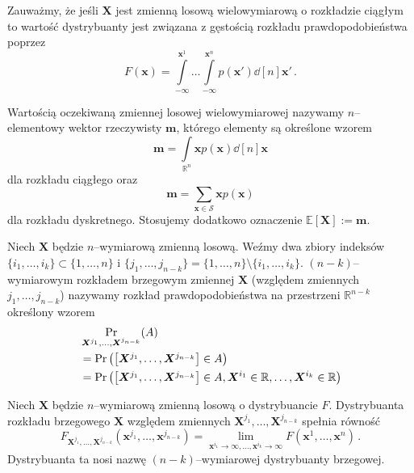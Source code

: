 \documentclass{myclass}
\numberwithin{equation}{subsection}
\begin{document}
Zauważmy, że jeśli \(\bm{X}\) jest zmienną losową wielowymiarową o rozkładzie ciągłym to wartość
dystrybuanty jest związana z gęstością rozkładu prawdopodobieństwa poprzez
\begin{equation}
    F(\bm{x}) = \int\limits_{-\infty}^{\bm{x}^1}\ldots\int\limits_{-\infty}^{\bm{x}^n} p(\bm{x}') \dd[n]{\bm{x}'}\,.
\end{equation}

\begin{definition}
Wartością oczekiwaną zmiennej losowej wielowymiarowej nazywamy \(n\)--elementowy wektor rzeczywisty
\(\bm{m}\), którego elementy są określone wzorem
\begin{equation*}
    \bm{m} = \int\limits_{\mathbb{R}^n} \bm{x} p(\bm{x}) \dd[n]{\bm{x}}
\end{equation*}
dla rozkładu ciągłego oraz
\begin{equation*}
    \bm{m} = \sum_{\bm{x} \in \mathcal{S}} \bm{x} p(\bm{x})
\end{equation*}
dla rozkładu dyskretnego. Stosujemy dodatkowo oznaczenie \(\mathbb{E}[\bm{X}] := \bm{m}\).
\end{definition}

\begin{definition}
Niech \(\bm{X}\) będzie \(n\)--wymiarową zmienną losową. Weźmy dwa zbiory indeksów
\(\{i_1,\ldots,i_k\} \subset \{1,\ldots,n\}\) i \(\{j_1,\ldots,j_{n-k}\} = \{1,\ldots,n\} \setminus
\{i_1,\ldots,i_k\}\). \((n-k)\)--wymiarowym rozkładem brzegowym zmiennej \(\bm{X}\) (względem
zmiennych \(j_1,\ldots,j_{n-k}\)) nazywamy rozkład prawdopodobieństwa na przestrzeni
\(\mathbb{R}^{n-k}\) określony wzorem
\begin{equation*}
    \begin{split}
        &\Pr_{\bm{X}^{j_1},\ldots,\bm{X}^{j_{n-k}}}(A) \\
        &= \Pr\left(\mqty[\bm{X}^{j_1},\ldots,\bm{X}^{j_{n-k}}] \in A\right)\\
        &= \Pr\left(\mqty[\bm{X}^{j_1},\ldots,\bm{X}^{j_{n-k}}] \in A, \bm{X}^{i_1} \in \mathbb{R}, \ldots, \bm{X}^{i_k} \in \mathbb{R}\right)
    \end{split}
\end{equation*}    
\end{definition}

Niech \(\bm{X}\) będzie \(n\)--wymiarową zmienną losową o dystrybuancie \(F\). Dystrybuanta rozkładu
brzegowego \(\bm{X}\) względem zmiennych \(\bm{X}^{j_1},\ldots,\bm{X}^{j_{n-k}}\) spełnia równość
\begin{equation}
    F_{\bm{X}^{j_1},\ldots,\bm{X}^{j_{n-k}}}(\bm{x}^{j_1},\ldots,\bm{x}^{j_{n-k}}) = \lim_{\bm{x}^{i_1} \to \infty,\ldots,\bm{x}^{i_k} \to \infty} F(\bm{x}^1,\ldots,\bm{x}^n)\,.
\end{equation}
Dystrybuanta ta nosi nazwę \((n-k)\)--wymiarowej dystrybuanty brzegowej.
\end{document}
